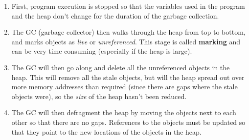 \begin{enumerate}
	
	\item First, program execution is stopped so that the variables used in
	the program and the heap don't change for the duration of the garbage
	collection.

	\item The GC (garbage collector) then walks through the heap from top to
	bottom, and marks objects as {\it live} or {\it unreferenced}. This stage
	is called {\bf marking} and can be very time consuming (especially if the
	heap is large).

	\item The GC will then go along and delete all the unreferenced objects in
	the heap. This will remove all the stale objects, but will the heap
	spread out over more memory addresses than required (since there are gaps
	where the stale objects were), so the {\it size} of the heap hasn't been
	reduced.

	\item The GC will then defragment the heap by moving the objects next to
	each other so that there are no gaps. References to the objects must be
	updated so that they point to the new locations of the objects in the
	heap.

\end{enumerate}

